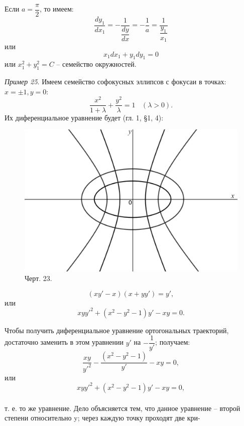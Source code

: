 \documentclass[a4paper,12pt]{article}
\begin{document}
Если $a=\dfrac{\pi}{2}$, то имеем:
$$
	\dfrac{dy_1}{dx_1}=-\dfrac{1}{\dfrac{dy}{dx}}=-\dfrac{1}{a}=\dfrac{1}{\dfrac{y_1}{x_1}}
$$
или
$$
	x_1dx_1+y_1dy_1=0
$$
или $x_1^2+y_1^2=C$ \--- семейство окружностей. 

\textit{Пример 25}. Имеем семейство софокусных эллипсов с фокусаи в точках: $x=\pm1, y=0:$
$$
	\dfrac{x^2}{1+\lambda}+\dfrac{y^2}{\lambda}=1 \ \ \ \ (\lambda > 0).
$$
Их диференциальное уравнение будет (гл. 1, \S 1, 4):

\begin{figure}
	\includegraphics[width=\linewidth]{desmos-graph.eps}
	\caption * {Черт. 23.} %
\end{figure}
$$
	(xy'-x)(x+yy')=y',
$$
или
$$
	xyy'^2+(x^2-y^2-1)y'-xy=0.
$$

Чтобы получить диференциальное уравнение ортогональных траекторий, достаточно заменить в этом уравнении $y'$ на $-\dfrac{1}{y'}$; получаем:
$$
	\dfrac{xy}{y'^2}-\dfrac{(x^2-y^2-1)}{y'}-xy=0,
$$
или
$$
	xyy'^2+(x^2-y^2-1)y'-xy=0,
$$\\
т. е. то же уравнение. Дело объясняется тем, что данное уравнение \--- второй степени относительно y; через каждую точку проходят две кри-
\end{document}
